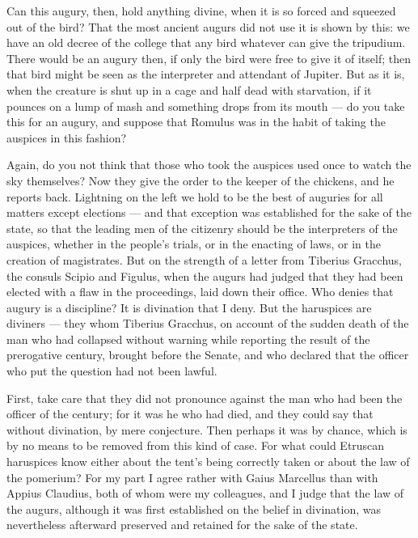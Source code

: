  Can this augury, then, hold anything divine, when it is so forced and squeezed out of the bird? That the most ancient augurs did not use it is shown by this: we have an old decree of the college that any bird whatever can give the tripudium. There would be an augury then, if only the bird were free to give it of itself; then that bird might be seen as the interpreter and attendant of Jupiter. But as it is, when the creature is shut up in a cage and half dead with starvation, if it pounces on a lump of mash and something drops from its mouth — do you take this for an augury, and suppose that Romulus was in the habit of taking the auspices in this fashion?

 Again, do you not think that those who took the auspices used once to watch the sky themselves? Now they give the order to the keeper of the chickens, and he reports back. Lightning on the left we hold to be the best of auguries for all matters except elections — and that exception was established for the sake of the state, so that the leading men of the citizenry should be the interpreters of the auspices, whether in the people's trials, or in the enacting of laws, or in the creation of magistrates. But on the strength of a letter from Tiberius Gracchus, the consuls Scipio and Figulus, when the augurs had judged that they had been elected with a flaw in the proceedings, laid down their office. Who denies that augury is a discipline? It is divination that I deny. But the haruspices are diviners — they whom Tiberius Gracchus, on account of the sudden death of the man who had collapsed without warning while reporting the result of the prerogative century, brought before the Senate, and who declared that the officer who put the question had not been lawful.

 First, take care that they did not pronounce against the man who had been the officer of the century; for it was he who had died, and they could say that without divination, by mere conjecture. Then perhaps it was by chance, which is by no means to be removed from this kind of case. For what could Etruscan haruspices know either about the tent's being correctly taken or about the law of the pomerium? For my part I agree rather with Gaius Marcellus than with Appius Claudius, both of whom were my colleagues, and I judge that the law of the augurs, although it was first established on the belief in divination, was nevertheless afterward preserved and retained for the sake of the state.

